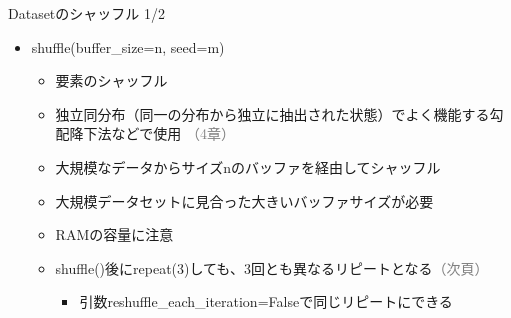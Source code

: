 \documentclass[aspectratio=169, dvipdfmx, 14pt, xcolor={svgnames,dvipsnames}, t]{beamer}
\begin{document}
\begin{frame}{Datasetのシャッフル 1/2}
  \begin{itemize}
    \tightlist
    \item shuffle(buffer\_size=n, seed=m)
          \begin{itemize}
            \tightlist
            \item
                  \alert{要素のシャッフル}
            \item
                  \alert{
                    独立同分布（同一の分布から独立に抽出された状態）でよく機能する勾配降下法などで使用
                  }
                  \textcolor{gray}{（4章）}
            \item
                  大規模なデータからサイズnのバッファを経由してシャッフル
            \item
                  大規模データセットに見合った大きいバッファサイズが必要
            \item
                  RAMの容量に注意
            \item
                  shuffle()後にrepeat(3)しても、3回とも異なるリピートとなる\textcolor{gray}{（次頁）}

                  \begin{itemize}
                    \tightlist
                    \item
                          引数reshuffle\_each\_iteration=Falseで同じリピートにできる
                  \end{itemize}
          \end{itemize}
  \end{itemize}

\end{frame}

\end{document}
